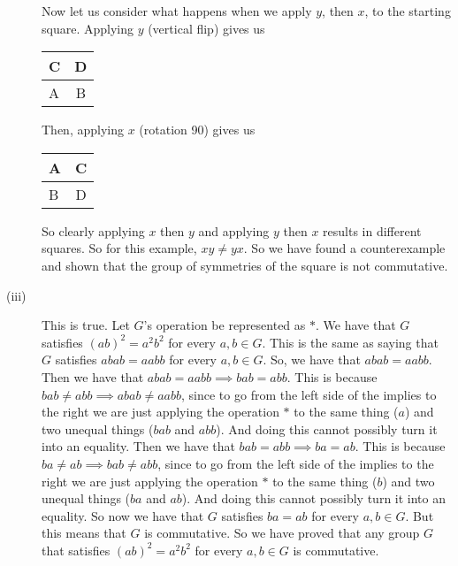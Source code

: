 \documentclass{article}
\begin{document}
\begin{description}
        Now let us consider what happens when we apply $y$, then $x$, to the
        starting square. Applying $y$ (vertical flip) gives us

        \begin{tabular}{ | l | c | }
            \hline
            C & D \\ \hline
            A & B \\
            \hline
        \end{tabular}

        Then, applying $x$ (rotation 90) gives us

        \begin{tabular}{ | l | c | }
            \hline
            A & C \\ \hline
            B & D \\
            \hline
        \end{tabular}

        So clearly applying $x$ then $y$ and applying $y$ then $x$ results
        in different squares. So for this example, $xy \neq yx$. So we have
        found a counterexample and shown that the group of symmetries of the
        square is not commutative.
    \item[(iii)] This is true. Let $G$'s operation be represented as $*$.
        We have that $G$ satisfies $(ab)^2 = a^2b^2$
        for every $a,b \in G$. This is the same as saying that $G$ satisfies
        $abab = aabb$ for every $a,b \in G$. So, we have that
        $abab = aabb$. Then we have that $abab = aabb \implies bab = abb$. This
        is because $bab \neq abb \implies abab \neq aabb$, since to go from
        the left side of the implies to the right we are just applying the
        operation $*$ to the same thing ($a$) and two
        unequal things ($bab$ and $abb$). And doing this cannot possibly turn
        it into an equality. Then we have that
        $bab = abb \implies ba = ab$. This is because $ba \neq ab \implies
        bab \neq abb$, since to go from the left side of the implies to the right
        we are just applying the operation $*$ to the
        same thing ($b$) and two unequal things ($ba$ and $ab$). And
        doing this cannot possibly turn it into an equality. So now we have
        that $G$ satisfies $ba = ab$ for every $a,b \in G$. But this means that
        $G$ is commutative. So we have proved that any group $G$ that
        satisfies $(ab)^2 = a^2b^2$ for every $a,b \in G$ is commutative.
\end{description}
\end{document}
